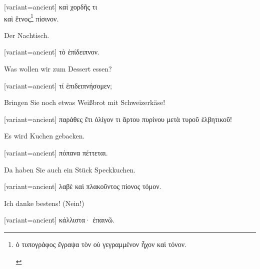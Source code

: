 \switchcolumn

\begin{greek}[variant=ancient]%
καὶ χορδῆς τι\\
καὶ ἔτνος\footnote{\begin{latin}%
\textgreek[variant=ancient]{ὁ τυπογράφος ἔγραψα τὸν οὐ γεγραμμένον
ἦχον καὶ τόνον.}\end{latin}%
} πίσινον.

\end{greek}%
\switchcolumn*

Der Nachtisch.

\switchcolumn

\begin{greek}[variant=ancient]%
τὸ ἐπίδειπνον.

\end{greek}%
\switchcolumn*

Was wollen wir zum Dessert essen?

\switchcolumn

\begin{greek}[variant=ancient]%
τί ἐπιδειπνήσομεν;

\end{greek}%
\switchcolumn*

Bringen Sie noch etwas Weißbrot mit Schweizerkäse!

\switchcolumn

\begin{greek}[variant=ancient]%
παράθες ἔτι ὀλίγον τι ἄρτου πυρίνου μετὰ τυροῦ ἑλβητικοῦ!

\end{greek}%
\switchcolumn*

Es wird Kuchen gebacken.

\switchcolumn

\begin{greek}[variant=ancient]%
πόπανα πέττεται.

\end{greek}%
\switchcolumn*

Da haben Sie auch ein Stück Speckkuchen.

\switchcolumn

\begin{greek}[variant=ancient]%
λαβὲ καὶ πλακοῦντος πίονος τόμον.

\end{greek}%
\switchcolumn*

Ich danke bestens! (Nein!)

\switchcolumn

\begin{greek}[variant=ancient]%
κάλλιστα· ἐπαινῶ.

\end{greek}%
\switchcolumn*

